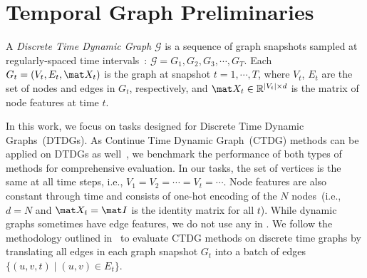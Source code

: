 




\section{Temporal Graph Preliminaries}


\begin{definition} 
A \emph{Discrete Time Dynamic Graph} $\mathcal{G}$ is a sequence of graph snapshots sampled at regularly-spaced time intervals~\cite{kazemi2020representation}:
$ \mathcal G = G_1,G_2,G_3,\cdots,G_T.$
Each $G_t = (V_t, E_t, \mat X_t)$ is the graph at snapshot $t=1,\cdots, T$, where ${V}_t$, ${E}_t$ are the set of nodes and edges in ${G}_t$, respectively, and $\mat X_t\in \mathbb R^{|V_t| \times d}$ is the matrix of node features at time $t$. %
\end{definition}


In this work, we focus on tasks designed for Discrete Time Dynamic Graphs~(DTDGs). As Continue Time Dynamic Graph~(CTDG) methods can be applied on DTDGs as well~\cite{huangutg}, we benchmark the performance of both types of methods for comprehensive evaluation.
In our tasks, the set of vertices is the same at all time steps, i.e., $V_1=V_2=\cdots =V_t = \cdots$. Node features are also constant through time and consists of one-hot encoding of the $N$ nodes~(i.e., $d=N$ and $\mat X_t = \mat I$ is the identity matrix for all $t$). While dynamic graphs sometimes have edge features, we do not use any in \benchmarkname. We follow the methodology outlined in~\cite{huangutg} to evaluate CTDG methods on discrete time graphs by translating all edges in each graph snapshot $G_t$ into a batch of edges $\{(u,v,t) \mid (u,v)\in E_t\}$. 


